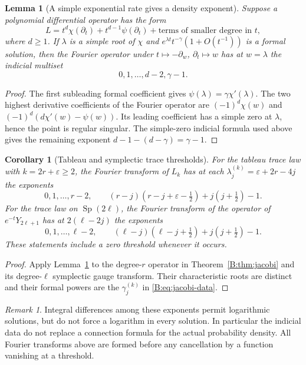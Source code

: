 \documentclass[11pt,a4paper]{article}
\newtheorem{lemma}[theorem]{Lemma}
\newtheorem{corollary}[theorem]{Corollary}
\theoremstyle{definition}
\theoremstyle{remark}
\newtheorem{remark}[theorem]{Remark}
\numberwithin{equation}{section}
\begin{document}
\begin{lemma}[A simple exponential rate gives a density exponent]
\label{B:upden:fourier}
Suppose a polynomial differential operator has the form
\[
 L=t^d\chi(\partial_t)+t^{d-1}\psi(\partial_t)
      +\text{terms of smaller degree in }t,
\]
where $d\ge1$. If $\lambda$ is a simple root of $\chi$ and
$e^{\lambda t}t^{-\gamma}(1+O(t^{-1}))$ is a formal solution,
then the Fourier operator under $t\mapsto-\partial_w$,
$\partial_t\mapsto w$ has at $w=\lambda$ the indicial multiset
\[
                     0,1,\ldots,d-2,\gamma-1.
\]
\end{lemma}
\begin{proof}
The first subleading formal coefficient gives
$\psi(\lambda)=\gamma\chi'(\lambda)$.
The two highest derivative coefficients of the Fourier operator are
$(-1)^d\chi(w)$ and $(-1)^d(d\chi'(w)-\psi(w))$.
Its leading coefficient has a simple zero at $\lambda$, hence the
point is regular singular. The simple-zero indicial formula used
above gives the remaining exponent
$d-1-(d-\gamma)=\gamma-1$.
\end{proof}

\begin{corollary}[Tableau and symplectic trace thresholds]
\label{B:upden:other}
For the tableau trace law with $k=2r+\varepsilon\ge2$,
the Fourier transform of $L_k$ has at each
$\lambda_j^{(k)}=\varepsilon+2r-4j$ the exponents
\[
 0,1,\ldots,r-2,\qquad
 (r-j)(r-j+\varepsilon-\tfrac12)+j(j+\tfrac12)-1.
\]
For the trace law on $\operatorname{Sp}(2\ell)$, the Fourier
transform of the operator of $e^{-t}Y_{2\ell+1}$ has at
$2(\ell-2j)$ the exponents
\[
 0,1,\ldots,\ell-2,\qquad
 (\ell-j)(\ell-j+\tfrac12)+j(j+\tfrac12)-1.
\]
These statements include a zero threshold whenever it occurs.
\end{corollary}
\begin{proof}
Apply Lemma~\ref{B:upden:fourier} to the degree-$r$ operator in
Theorem~\ref{B:thm:jacobi} and its degree-$\ell$ symplectic gauge
transform. Their characteristic roots are distinct and their formal
powers are the $\gamma_j^{(k)}$ in \eqref{B:eq:jacobi-data}.
\end{proof}

\begin{remark}
Integral differences among these exponents permit logarithmic
solutions, but do not force a logarithm in every solution.
In particular the indicial data do not replace a connection formula
for the actual probability density. All Fourier transforms above are
formed before any cancellation by a function vanishing at a threshold.
\end{remark}
\end{document}
